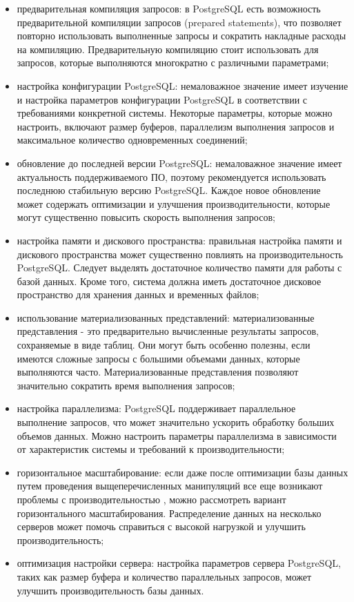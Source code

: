\begin{itemize}
    \item предварительная компиляция запросов: в PostgreSQL есть возможность предварительной компиляции запросов (prepared statements), что позволяет повторно использовать выполненные запросы и сократить накладные расходы на компиляцию. Предварительную компиляцию стоит использовать для запросов, которые выполняются многократно с различными параметрами;
    \item настройка конфигурации PostgreSQL: немаловажное значение имеет изучение и настройка параметров конфигурации PostgreSQL в соответствии с требованиями конкретной системы. Некоторые параметры, которые можно настроить, включают размер буферов, параллелизм выполнения запросов и максимальное количество одновременных соединений;
    \item обновление до последней версии PostgreSQL: немаловажное значение имеет актуальность поддерживаемого ПО, поэтому рекомендуется использовать последнюю стабильную версию PostgreSQL. Каждое новое обновление может содержать оптимизации и улучшения производительности, которые могут существенно повысить скорость выполнения запросов;
    \item настройка памяти и дискового пространства: правильная настройка памяти и дискового пространства может существенно повлиять на производительность PostgreSQL. Следует выделять достаточное количество памяти для работы с базой данных. Кроме того, система должна иметь достаточное дисковое пространство для хранения данных и временных файлов;
    \item использование материализованных представлений: материализованные представления - это предварительно вычисленные результаты запросов, сохраняемые в виде таблиц. Они могут быть особенно полезны, если имеются сложные запросы с большими объемами данных, которые выполняются часто. Материализованные представления позволяют значительно сократить время выполнения запросов;
    \item настройка параллелизма: PostgreSQL поддерживает параллельное выполнение запросов, что может значительно ускорить обработку больших объемов данных. Можно настроить параметры параллелизма в зависимости от характеристик системы и требований к производительности;
    \item горизонтальное масштабирование: если даже после оптимизации базы данных путем проведения выщеперечисленных манипуляций все еще возникают проблемы с производительностью , можно рассмотреть вариант горизонтального масштабирования. Распределение данных на несколько серверов может помочь справиться с высокой нагрузкой и улучшить производительность;
    \item оптимизация настройки сервера: настройка параметров сервера PostgreSQL, таких как размер буфера и количество параллельных запросов, может улучшить производительность базы данных.
\end{itemize}

